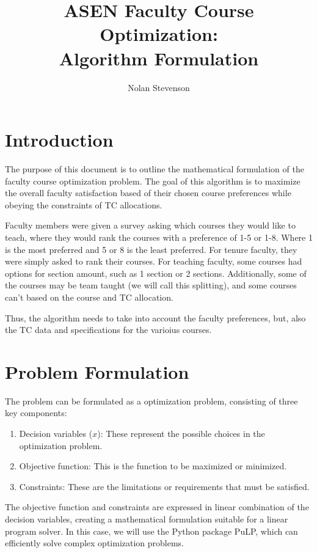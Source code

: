 \documentclass{article}
\title{ASEN Faculty Course Optimization:\\
Algorithm Formulation}
\author{Nolan Stevenson}
\date{} %
\begin{document}
\maketitle

\newpage
\section{Introduction}

	The purpose of this document is to outline the mathematical formulation of the faculty course optimization problem.
    The goal of this algorithm is to maximize the overall faculty satisfaction based of their chosen course preferences while obeying the constraints of TC allocations.

    Faculty members were given a survey asking which courses they would like to teach, where they would rank the courses with a preference of 1-5 or 1-8. Where 1 is the most preferred and 5 or 8 is the least preferred.
    For tenure faculty, they were simply asked to rank their courses. For teaching faculty, some courses had options for section amount, such as 1 section or 2 sections.
    Additionally, some of the courses may be team taught (we will call this splitting), and some courses can't based on the course and TC allocation.

    Thus, the algorithm needs to take into account the faculty preferences, but, also the TC data and specifications for the varioius courses.
    

\section{Problem Formulation}

    The problem can be formulated as a optimization problem, consisting of three key components:
    
    \begin{enumerate}
        \item Decision variables ($x$): These represent the possible choices in the optimization problem.
        \item Objective function: This is the function to be maximized or minimized.
        \item Constraints: These are the limitations or requirements that must be satisfied.
    \end{enumerate}
    
    The objective function and constraints are expressed in linear combination of the decision variables, creating a mathematical formulation suitable for a linear program solver. In this case, we will use the Python package PuLP, which can efficiently solve complex optimization problems.
    
\end{document}
